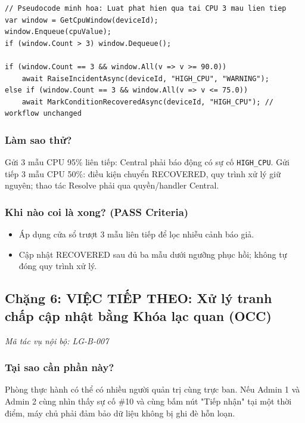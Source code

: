 \documentclass[12pt,a4paper]{article}
\begin{document}
\begin{lstlisting}[language=CSharp, caption={Pseudocode minh họa: Phát hiện quá tải với cửa sổ trượt}]
// Pseudocode minh hoa: Luat phat hien qua tai CPU 3 mau lien tiep
var window = GetCpuWindow(deviceId);
window.Enqueue(cpuValue);
if (window.Count > 3) window.Dequeue();

if (window.Count == 3 && window.All(v => v >= 90.0))
    await RaiseIncidentAsync(deviceId, "HIGH_CPU", "WARNING");
else if (window.Count == 3 && window.All(v => v <= 75.0))
    await MarkConditionRecoveredAsync(deviceId, "HIGH_CPU"); // workflow unchanged
\end{lstlisting}

\subsubsection{Làm sao thử?}
Gửi 3 mẫu CPU 95\% liên tiếp: Central phải báo động có sự cố \texttt{HIGH\_CPU}. Gửi tiếp 3 mẫu CPU 50\%: điều kiện chuyển RECOVERED, quy trình xử lý giữ nguyên; thao tác Resolve phải qua quyền/handler Central.

\subsubsection{Khi nào coi là xong? (PASS Criteria)}
\begin{itemize}
  \item Áp dụng cửa sổ trượt 3 mẫu liên tiếp để lọc nhiễu cảnh báo giả.
  \item Cập nhật RECOVERED sau đủ ba mẫu dưới ngưỡng phục hồi; không tự đóng quy trình xử lý.
\end{itemize}

\subsection{Chặng 6: VIỆC TIẾP THEO: Xử lý tranh chấp cập nhật bằng Khóa lạc quan (OCC)}
{\footnotesize\color{lgGray}\textit{Mã tác vụ nội bộ: LG-B-007}}\par
\vspace{2mm}

\subsubsection{Tại sao cần phần này?}
Phòng thực hành có thể có nhiều người quản trị cùng trực ban. Nếu Admin 1 và Admin 2 cùng nhìn thấy sự cố \#10 và cùng bấm nút "Tiếp nhận" tại một thời điểm, máy chủ phải đảm bảo dữ liệu không bị ghi đè hỗn loạn.
\end{document}
